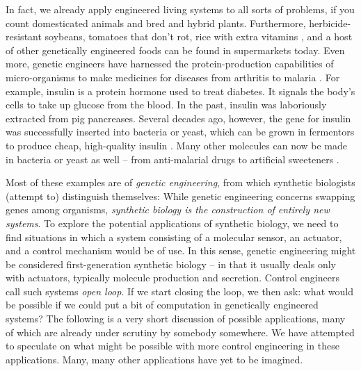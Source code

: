 In fact, we already apply engineered living systems to all sorts of
problems, if you count domesticated animals and bred and hybrid
plants. Furthermore, herbicide-resistant soybeans, tomatoes that don't
rot, rice with extra vitamins \cite{transgenic-crops}, and a host of
other genetically engineered foods can be found in supermarkets
today. Even more, genetic engineers have harnessed the
protein-production capabilities of micro-organisms to make medicines
for diseases from arthritis \cite{arthritis-protein} to malaria
\cite{artemisinin}. For example, insulin is a protein hormone used to
treat diabetes. It signals the body's cells to take up glucose from
the blood. In the past, insulin was laboriously extracted from pig
pancreases. Several decades ago, however, the gene for insulin was
successfully inserted into bacteria or yeast, which can be grown in
fermentors to produce cheap, high-quality insulin
\cite{insulin-bact,insulin-yeast}. Many other molecules can now be
made in bacteria or yeast as well -- from anti-malarial drugs
\cite{keasling-art} to artificial sweeteners \cite{aspartamene}.

Most of these examples are of {\em genetic engineering}, from which
synthetic biologists (attempt to) distinguish themselves: While
genetic engineering concerns swapping genes among organisms, {\em
  synthetic biology is the construction of entirely new
  systems\footnotemark}. To explore the potential applications of
synthetic biology, we need to find situations in which a system
consisting of a molecular sensor, an actuator, and a control mechanism
would be of use. In this sense, genetic engineering might be
considered first-generation synthetic biology -- in that it usually
deals only with actuators, typically molecule production and
secretion. Control engineers call such systems {\em open loop}. If we
start closing the loop, we then ask: what would be possible if we
could put a bit of computation in genetically engineered systems? The
following is a very short discussion of possible applications, many of
which are already under scrutiny by somebody somewhere. We have
attempted to speculate on what might be possible with more control
engineering in these applications. Many, many other applications have
yet to be imagined.



